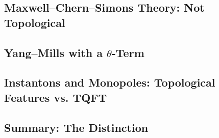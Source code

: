 \subsection{Maxwell--Chern--Simons Theory: Not Topological}

%
%


\subsection{\texorpdfstring{Yang--Mills with a $\theta$-Term}{Yang--Mills with a theta-Term}}


\subsection{Instantons and Monopoles: Topological Features vs. TQFT}

%
%
%

\subsection{Summary: The Distinction}

%
%

